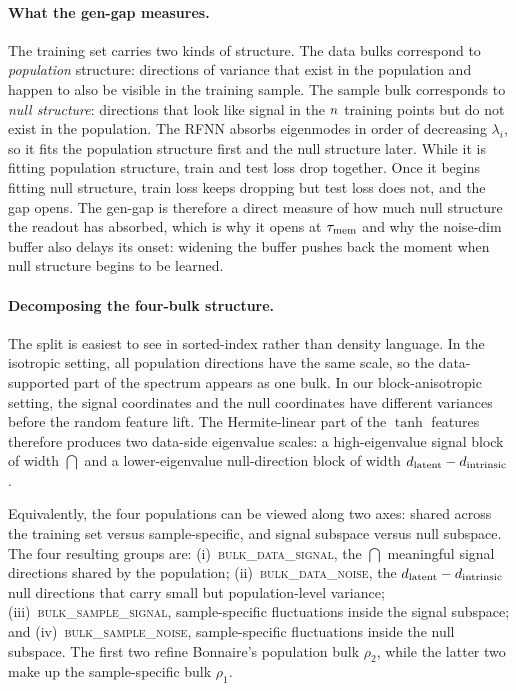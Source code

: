 \paragraph{What the gen-gap measures.}
The training set carries two kinds of structure. The data bulks
correspond to \emph{population} structure: directions of variance
that exist in the population and happen to also be visible in the
training sample. The sample bulk corresponds to \emph{null
structure}: directions that look like signal in the $n$
training points but do not exist in the population. The RFNN
absorbs eigenmodes in order of decreasing $\lambda_i$, so it fits
the population structure first and the null structure later. While
it is fitting population structure, train and test loss drop
together. Once it begins fitting null structure, train loss keeps
dropping but test loss does not, and the gap opens. The gen-gap is
therefore a direct measure of how much null structure the readout
has absorbed, which is why it opens at $\tau_{\mathrm{mem}}$ and why the
noise-dim buffer also delays its onset: widening the buffer pushes
back the moment when null structure begins to be learned.

\paragraph{Decomposing the four-bulk structure.}
The split is easiest to see in sorted-index rather than density
language. In the isotropic setting, all population directions have
the same scale, so the data-supported part of the spectrum appears
as one bulk. In our block-anisotropic setting, the signal coordinates
and the null coordinates have different variances before the random
feature lift. The Hermite-linear part of the $\tanh$ features
therefore produces two data-side eigenvalue scales: a high-eigenvalue
signal block of width $\dint$ and a lower-eigenvalue null-direction
block of width $d_{\mathrm{latent}}-d_{\mathrm{intrinsic}}$.

Equivalently, the four populations can be viewed along two axes:
shared across the training set versus sample-specific, and signal
subspace versus null subspace. The four resulting groups are:
(i)~\textsc{bulk\_data\_signal}, the $\dint$ meaningful signal
directions shared by the population;
(ii)~\textsc{bulk\_data\_noise}, the $d_{\mathrm{latent}}-d_{\mathrm{intrinsic}}$ null directions
that carry small but population-level variance;
(iii)~\textsc{bulk\_sample\_signal}, sample-specific fluctuations
inside the signal subspace; and
(iv)~\textsc{bulk\_sample\_noise}, sample-specific fluctuations
inside the null subspace. The first two refine Bonnaire's
population bulk $\rho_2$, while the latter two make up the
sample-specific bulk $\rho_1$.

